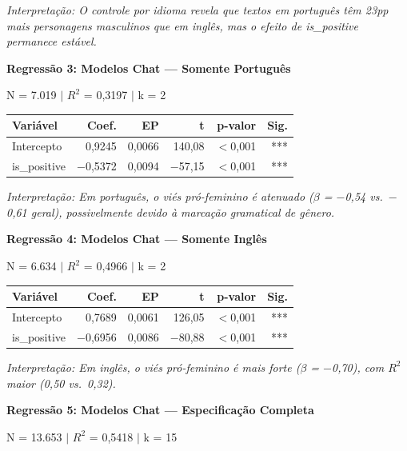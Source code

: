 \documentclass[12pt,a4paper]{article}
\begin{document}
\noindent\textit{Interpretação: O controle por idioma revela que textos em português têm
23pp mais personagens masculinos que em inglês, mas o efeito de
is\_positive permanece estável.}

\vspace{0.5cm}
\noindent\textbf{Regressão 3: Modelos Chat --- Somente Português}

\noindent N = 7.019 $|$ $R^2$ = 0,3197 $|$ k = 2

\begin{table}[H]
\centering
\begin{tabular}{lrrrrr}
\toprule
\textbf{Variável} & \textbf{Coef.} & \textbf{EP} & \textbf{t} & \textbf{p-valor} & \textbf{Sig.} \\
\midrule
Intercepto & 0,9245 & 0,0066 & 140,08 & $<$0,001 & *** \\
is\_positive & $-$0,5372 & 0,0094 & $-$57,15 & $<$0,001 & *** \\
\bottomrule
\end{tabular}
\end{table}

\noindent\textit{Interpretação: Em português, o viés pró-feminino é atenuado ($\beta$ = $-$0,54
vs.\ $-$0,61 geral), possivelmente devido à marcação gramatical de gênero.}

\vspace{0.5cm}
\noindent\textbf{Regressão 4: Modelos Chat --- Somente Inglês}

\noindent N = 6.634 $|$ $R^2$ = 0,4966 $|$ k = 2

\begin{table}[H]
\centering
\begin{tabular}{lrrrrr}
\toprule
\textbf{Variável} & \textbf{Coef.} & \textbf{EP} & \textbf{t} & \textbf{p-valor} & \textbf{Sig.} \\
\midrule
Intercepto & 0,7689 & 0,0061 & 126,05 & $<$0,001 & *** \\
is\_positive & $-$0,6956 & 0,0086 & $-$80,88 & $<$0,001 & *** \\
\bottomrule
\end{tabular}
\end{table}

\noindent\textit{Interpretação: Em inglês, o viés pró-feminino é mais forte ($\beta$ = $-$0,70),
com $R^2$ maior (0,50 vs.\ 0,32).}

\vspace{0.5cm}
\noindent\textbf{Regressão 5: Modelos Chat --- Especificação Completa}

\noindent N = 13.653 $|$ $R^2$ = 0,5418 $|$ k = 15
\end{document}
